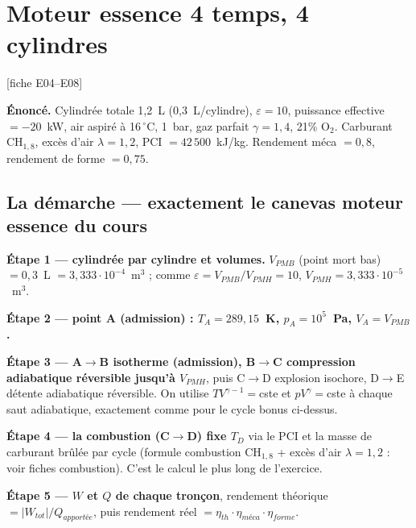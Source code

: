 \documentclass[11pt,a4paper]{article}
\newcommand{\fiche}[1]{\hfill{\small\color{cgris}[fiche #1]}}
\begin{document}
\newpage
\section{Moteur essence 4 temps, 4 cylindres}
\fiche{E04--E08}

\begin{enonce}
\textbf{Énoncé.} Cylindrée totale 1,2~L (0,3~L/cylindre), $\varepsilon=10$, puissance
effective $=-20$~kW, air aspiré à 16$\,^\circ$C, 1~bar, gaz parfait $\gamma=1{,}4$,
21\% O$_2$. Carburant CH$_{1,8}$, excès d'air $\lambda=1{,}2$, PCI $=42\,500$~kJ/kg.
Rendement méca $=0{,}8$, rendement de forme $=0{,}75$.
\end{enonce}

\subsection*{La démarche --- exactement le canevas moteur essence du cours}
\begin{etape}
\textbf{Étape 1 --- cylindrée par cylindre et volumes.}
$V_{PMB}$ (point mort bas) $=0{,}3$~L $=3{,}333\cdot10^{-4}$~m$^3$ ; comme
$\varepsilon=V_{PMB}/V_{PMH}=10$, $V_{PMH}=3{,}333\cdot10^{-5}$~m$^3$.
\end{etape}

\begin{etape}
\textbf{Étape 2 --- point A (admission) : $T_A=289{,}15$~K, $p_A=10^5$~Pa,
$V_A=V_{PMB}$.}
\end{etape}

\begin{etape}
\textbf{Étape 3 --- A$\to$B isotherme (admission), B$\to$C compression adiabatique
réversible jusqu'à $V_{PMH}$}, puis C$\to$D explosion isochore, D$\to$E détente
adiabatique réversible. On utilise $TV^{\gamma-1}=$cste et $pV^\gamma=$cste à chaque
saut adiabatique, exactement comme pour le cycle bonus ci-dessus.
\end{etape}

\begin{etape}
\textbf{Étape 4 --- la combustion (C$\to$D) fixe $T_D$} via le PCI et la masse de
carburant brûlée par cycle (formule combustion CH$_{1,8}$ + excès d'air $\lambda=1{,}2$ :
voir fiches combustion). C'est le calcul le plus long de l'exercice.
\end{etape}

\begin{etape}
\textbf{Étape 5 --- $W$ et $Q$ de chaque tronçon}, rendement théorique $=|W_{tot}|/Q_{apportée}$,
puis rendement réel $=\eta_{th}\cdot\eta_{méca}\cdot\eta_{forme}$.
\end{etape}
\end{document}
